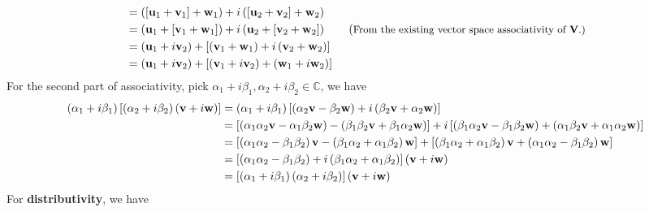 \begin{solution}
\begin{align*}
    &= \left( \left[ \vb{u}_{1} +\vb{v}_{1} \right] + \vb{w}_{1}\right) + i\left(  \left[ \vb{u}_{2} +\vb{v}_{2}  \right] + \vb{w}_{2}\right) \\
    &= \left( \vb{u}_{1} + \left[ \vb{v}_{1} + \vb{w}_{1} \right] \right) + i \left( \vb{u}_{2} + \left[ \vb{v}_{2} + \vb{w}_{2} \right] \right) \tag{\small From the existing vector space associativity of $\mathbf{V}$.} \\
    &= \left( \vb{u}_{1} + i \vb{v}_{2} \right) + \left[ \left( \vb{v}_{1} + \vb{w}_{1} \right) + i \left( \vb{v}_{2} + \vb{w}_{2} \right)  \right]\\
    &= \left( \vb{u}_{1} + i \vb{v}_{2} \right) + \left[  \left( \vb{v}_{1} + i \vb{v}_{2} \right) + \left( \vb{w}_{1} + i \vb{w}_{2} \right) \right]
  \end{align*}
  For the second part of associativity, pick \( \alpha_{1} + i \beta_{1}, \alpha_{2} + i \beta_{2} \in \mathbb{C} \), we have 
  \begin{align*}
    \left(  \alpha_{1} + i \beta_{1} \right) \left[ \left( \alpha_{2} + i \beta_{2}  \right)\left( \vb{v}+ i\vb{w} \right) \right] &=  \left(  \alpha_{1} + i \beta_{1} \right)  \left[  \left( \alpha_{2}\vb{v} - \beta_{2} \vb{w} \right) + i \left( \beta_{2}\vb{v} + \alpha_{2} \vb{w} \right)\right] \\
    &= \left[ \left( \alpha_{1}\alpha_{2} \vb{v} - \alpha_{1} \beta_{2} \vb{w} \right) - \left( \beta_{1} \beta_{2} \vb{v} + \beta_{1} \alpha_{2} \vb{w} \right) \right] + i \left[ \left( \beta_{1} \alpha_{2} \vb{v} - \beta_{1} \beta_{2} \vb{w} \right)  + \left( \alpha_{1} \beta_{2} \vb{v}  + \alpha_{1} \alpha_{2} \vb{w} \right)\right]
    \\
    &= \left[ \left( \alpha_{1} \alpha_{2} -\beta_{1} \beta_{2} \right) \vb{v} - \left( \beta_{1} \alpha_{2} + \alpha_{1} \beta_{2} \right)  \vb{w}\right] + \left[ \left( \beta_{1}\alpha_{2} + \alpha_{1} \beta_{2}\right) \vb{v} + \left( \alpha_{1} \alpha_{2}-\beta_{1}\beta_{2} \right)  \vb{w}\right] \\
    &= \left[ \left(  \alpha_{1} \alpha_{2}-\beta_{1}\beta_{2} \right) + i \left(  \beta_{1}\alpha_{2} + \alpha_{1} \beta_{2}  \right) \right] \left( \vb{v}+ i \vb{w} \right) \\
    &= \left[ \left( \alpha_{1} + i \beta_{1} \right) \left( \alpha_{2} + i \beta_{2}  \right) \right] \left(  \vb{v}+ i \vb{w} \right)
  \end{align*}
  For \textbf{distributivity}, we have 
  \begin{align*}

\end{align*}
\end{solution}
